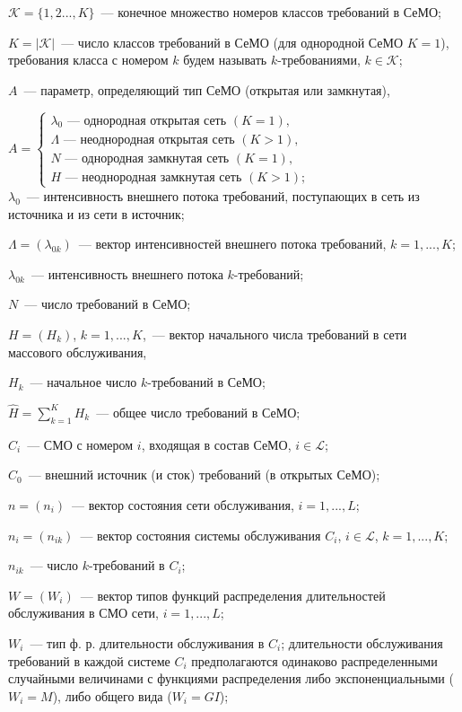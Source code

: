$\mathscr{K}=\{1,2...,K\}$~--- конечное множество номеров классов требований в СеМО;

$K=\left| \mathscr{K} \right|$~--- число классов требований в СеМО (для однородной СеМО $K=1$), требования класса с номером $k$ будем называть $k$-требованиями, $k \in \mathscr{K}$;

$A$~--- параметр, определяющий тип СеМО (открытая или замкнутая),

$ A = \left\{
 \begin{array}{l}
  \lambda_0 \text{ --- однородная открытая сеть } (K=1) , \\
  \Lambda \text{ --- неоднородная открытая сеть } (K>1), \\
  N \text{ --- однородная замкнутая сеть } (K=1), \\
  H \text{ --- неоднородная замкнутая сеть } (K>1);
 \end{array}
\right. $ \\

$\lambda_0$~--- интенсивность внешнего потока требований, поступающих в сеть из источника и из сети в источник;

$\Lambda=(\lambda_{0k})$~--- вектор интенсивностей внешнего потока требований, $k=1,...,K$;

$\lambda_{0k}$~--- интенсивность внешнего потока $k$-требований;

$N$~--- число требований в СеМО;

$H=(H_k)$, $k=1,...,K$,~--- вектор начального числа требований в сети массового обслуживания,

$H_k$~--- начальное число $k$-требований в СеМО;

$\hat{H}=\sum\limits_{k=1}^K H_k$~--- общее число требований в СеМО;

$C_i$~--- СМО с номером $i$, входящая в состав СеМО, $i \in \mathscr{L}$;

$C_0$~--- внешний источник (и сток) требований (в открытых СеМО);

$n=(n_i)$~--- вектор состояния сети обслуживания, $i=1,...,L$;

$n_i=(n_{ik})$~--- вектор состояния системы обслуживания $C_i$, $i \in \mathscr{L}$, $k=1,...,K$;

$n_{ik}$~--- число $k$-требований в $C_i$;

$W=(W_i)$~--- вектор типов функций распределения длительностей обслуживания в СМО сети, $i=1,...,L$;

$W_i$~--- тип ф. р. длительности обслуживания в $C_i$; длительности обслуживания требований в каждой системе $C_i$ предполагаются одинаково распределенными случайными величинами с функциями распределения либо экспоненциальными ($W_i=M$), либо общего вида ($W_i=GI$);

